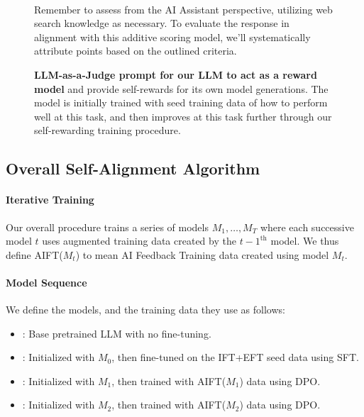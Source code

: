 \documentclass{article}
\begin{document}
\begin{figure}[t]
\begin{tcolorbox}
\\
Remember to assess from the AI Assistant perspective, utilizing web search knowledge as necessary. To evaluate the response in alignment with this additive scoring model, we'll systematically attribute points based on the outlined criteria.
\end{tcolorbox}
\caption{{\bf LLM-as-a-Judge prompt for our LLM to act as a  reward model} and provide self-rewards for its own model generations. The model is initially trained with seed training data of how to perform well at this task, and then improves at this task further through our self-rewarding  training procedure.}
\label{tab:eval_prompt}
\end{figure}




\subsection{Overall Self-Alignment Algorithm}

\paragraph{Iterative Training}
Our overall procedure trains a series of models $M_1,\dots,M_T$ where each successive model $t$ uses augmented training data created 
by the $t-1^\text{th}$ model.  We thus define AIFT($M_t$) to mean AI Feedback Training data created using model $M_t$. 

\paragraph{Model Sequence}
\label{sec:model-sequence}
We define the  models, and the training data they use as follows: 

\begin{itemize}[topsep=0pt,itemsep=4pt,parsep=0pt]
\item[$M_0$]: Base pretrained LLM with no fine-tuning.

\item[$M_1$]: Initialized with $M_0$, then fine-tuned on the IFT+EFT seed data using SFT.

\item[$M_2$]: Initialized with $M_1$, then trained with AIFT($M_1$) data using DPO.

\item[$M_3$]: Initialized with $M_2$, then trained with AIFT($M_2$) data using DPO.

\end{itemize}
\end{document}
